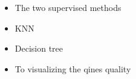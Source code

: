 \begin{itemize}
    \item The two supervised methods
    \item KNN
    \item Decision tree
    \item To visualizing the qines quality
\end{itemize}